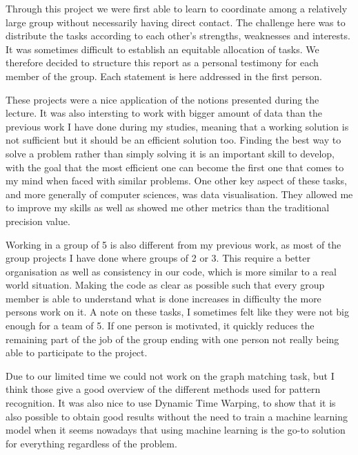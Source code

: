 \documentclass{homework}
\begin{document}
\maketitle



Through this project we were first able to learn to coordinate among a relatively large group without necessarily having direct contact. The challenge here was to distribute the tasks according to each other's strengths, weaknesses and interests. It was sometimes difficult to establish an equitable allocation of tasks. We therefore decided to structure this report as a personal testimony for each member of the group. Each statement is here addressed in the first person.

These projects were a nice application of the notions presented during the lecture. It was also intersting to work with bigger amount of data than the previous work I have done during my studies, meaning that a working solution is not sufficient but it should be an efficient solution too. Finding the best way to solve a problem rather than simply solving it is an important skill to develop, with the goal that the most efficient one can become the first one that comes to my mind when faced with similar problems. One other key aspect of these tasks, and more generally of computer sciences, was data visualisation. They allowed me to improve my skills as well as showed me other metrics than the traditional precision value.

Working in a group of 5 is also different from my previous work, as most of the group projects I have done where groups of 2 or 3. This require a better organisation as well as consistency in our code, which is more similar to a real world situation. Making the code as clear as possible such that every group member is able to understand what is done increases in difficulty the more persons work on it. A note on these tasks, I sometimes felt like they were not big enough for a team of 5. If one person is motivated, it quickly reduces the remaining part of the job of the group ending with one person not really being able to participate to the project.

Due to our limited time we could not work on the graph matching task, but I think those give a good overview of the different methods used for pattern recognition. It was also nice to use Dynamic Time Warping, to show that it is also possible to obtain good results without the need to train a machine learning model when it seems nowadays that using machine learning is the go-to solution for everything regardless of the problem.
\end{document}
